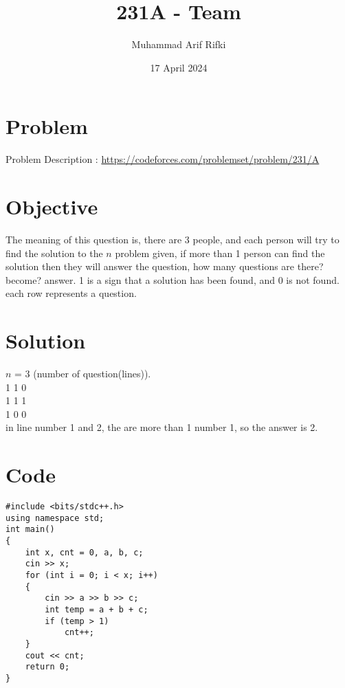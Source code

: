 \documentclass{article}
\title{231A -  Team}
\author{Muhammad Arif Rifki}
\date{17 April 2024}
\begin{document}
\maketitle


\section{Problem}

Problem Description : \href{https://codeforces.com/problemset/problem/231/A}{https://codeforces.com/problemset/problem/231/A}

\section{Objective}

The meaning of this question is, there are 3 people, and each person will try to find the solution to the $n$ problem given, if more than 1 person can find the solution then they will answer the question, how many questions are there? become? answer. 1 is a sign that a solution has been found, and 0 is not found. each row represents a question.
\section{Solution}

$n$ = 3 (number of question(lines)).
\\1 1 0
\\1 1 1
\\1 0 0
\\in line number 1 and 2, the are more than 1 number 1, so the answer is 2.



\newpage
\section{Code}

\begin{lstlisting}
#include <bits/stdc++.h>
using namespace std;
int main()
{
    int x, cnt = 0, a, b, c;
    cin >> x;
    for (int i = 0; i < x; i++)
    {
        cin >> a >> b >> c;
        int temp = a + b + c;
        if (temp > 1)
            cnt++;
    }
    cout << cnt;
    return 0;
}

\end{lstlisting}
\end{document}
